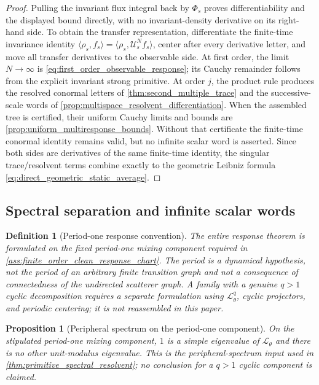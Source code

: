\documentclass[11pt]{amsart}
\theoremstyle{compactplain}
\newtheorem*{proposition*}{Proposition}
\theoremstyle{compactdefinition}
\newtheorem*{definition*}{Definition}
\theoremstyle{compactremark}
\newcommand{\Ltransfer}{\mathscr L}
\begin{document}
\begin{proof}
Pulling the invariant flux integral back by \(\Phi_s\) proves differentiability
and the displayed bound directly, with no invariant-density derivative on its
right-hand side.  To obtain the transfer representation, differentiate the
finite-time invariance identity
\(\langle\rho_s,f_s\rangle
=\langle\rho_s,\mathscr U_s^Nf_s\rangle\), center after every derivative
letter, and move all transfer derivatives to the observable side.  At first
  order, the limit \(N\to\infty\) is
  \eqref{eq:first_order_observable_response}; its Cauchy remainder follows from
  the explicit invariant strong primitive.  At order \(j\), the product rule
produces the resolved conormal letters of \cref{thm:second_multiple_trace} and
the successive-scale words of
  \cref{prop:multispace_resolvent_differentiation}.  When the assembled tree is
  certified, their uniform Cauchy limits and bounds are
  \cref{prop:uniform_multiresponse_bounds}.  Without that certificate the
  finite-time conormal identity remains valid, but no infinite scalar word is
  asserted.  Since both sides are
derivatives of the same finite-time identity, the singular trace/resolvent
terms combine exactly to the geometric Leibniz formula
\eqref{eq:direct_geometric_static_average}.
\end{proof}

\subsection{Spectral separation and infinite scalar words}

\begin{definition*}[Period-one response convention]
The entire response theorem is formulated on the fixed period-one mixing
component required in \cref{ass:finite_order_clean_response_chart}.  The
period is a dynamical hypothesis, not the period of an arbitrary finite
transition graph and not a consequence of connectedness of the undirected
scatterer graph.  A family with a genuine \(q>1\) cyclic decomposition
requires a separate formulation using \(\Ltransfer_\theta^q\), cyclic
projectors, and periodic centering; it is not reassembled in this paper.
\end{definition*}

\begin{proposition*}[Peripheral spectrum on the period-one component]
On the stipulated period-one mixing component, \(1\) is a simple eigenvalue of
\(\Ltransfer_\theta\) and there is no other unit-modulus eigenvalue.  This is
the peripheral-spectrum input used in
\cref{thm:primitive_spectral_resolvent}; no conclusion for a \(q>1\) cyclic
component is claimed.
\end{proposition*}
\end{document}
